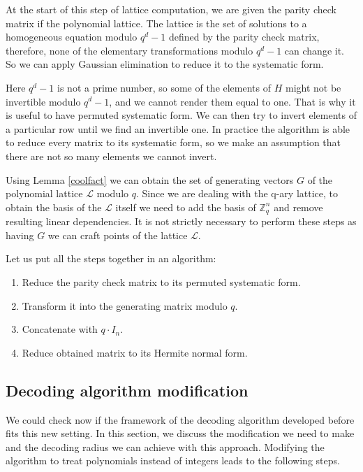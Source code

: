 \documentclass[12pt]{article}
\newcommand{\ZZ}{\mathbb{Z}}
\newcommand{\LL}{\mathcal{L}}
\begin{document}
At the start of this step of lattice computation, we are given the parity check matrix if the polynomial lattice. The lattice is the set of solutions to a homogeneous equation modulo $q^{d} -1$ defined by the parity check matrix, therefore, none of the elementary transformations modulo $q^{d} -1$ can change it. So we can apply Gaussian elimination to reduce it to the systematic form.

Here $q^{d} -1$ is not a prime number, so some of the elements of $H$ might not be invertible modulo $q^{d} -1$, and we cannot render them equal to one. That is why it is useful to have permuted systematic form. We can then try to invert elements of a particular row until we find an invertible one. In practice the algorithm is able to reduce every matrix to its systematic form, so we make an assumption that there are not so many elements we cannot invert.

Using Lemma \ref{coolfact} we can obtain the set of generating vectors $G$ of the polynomial lattice $\LL$ modulo $q$. Since we are dealing with the q-ary lattice, to obtain the basis of the $\LL$ itself we need to add the basis of $\ZZ^{n}_{q}$ and remove resulting linear dependencies. It is not strictly necessary to perform these steps as having $G$ we can craft points of the lattice $\LL$.

Let us put all the steps together in an algorithm:
\begin{enumerate}
    \item Reduce the parity check matrix to its permuted systematic form.
    \item Transform it into the generating matrix modulo $q$.
    \item Concatenate with $q \cdot I_{n}$.
    \item Reduce obtained matrix to its Hermite normal form.
\end{enumerate}


\subsection{Decoding algorithm modification}
\label{subsec:decoding_polynomials}

We could check now if the framework of the decoding algorithm developed before fits this new setting. In this section, we discuss the modification we need to make and the decoding radius we can achieve with this approach. Modifying the algorithm to treat polynomials instead of integers leads to the following steps.
\end{document}
